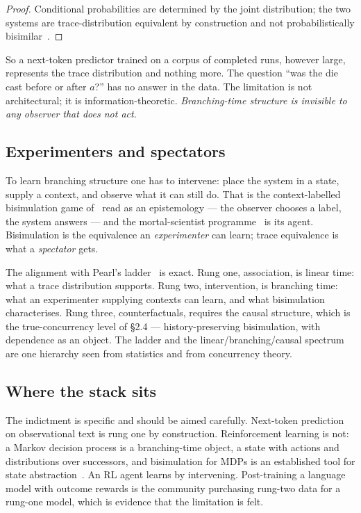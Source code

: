 \documentclass[11pt]{article}
\theoremstyle{plain}
\theoremstyle{definition}
\theoremstyle{remark}
\begin{document}
\begin{proof}
Conditional probabilities are determined by the joint distribution; the two systems are
trace-distribution equivalent by construction and not probabilistically
bisimilar~\cite{LarsenSkou91}.
\end{proof}

So a next-token predictor trained on a corpus of completed runs, however
large, represents the trace distribution and nothing more. The question
``was the die cast before or after $a$?'' has no answer in the data. The
limitation is not architectural; it is information-theoretic.
\emph{Branching-time structure is invisible to any observer that does not
act.}

\subsection{Experimenters and spectators}

To learn branching structure one has to intervene: place the system in a
state, supply a context, and observe what it can still do. That is the
context-labelled bisimulation game of~\cite{BIHOL,Extension} read as an
epistemology --- the observer chooses a label, the system answers --- and the
mortal-scientist programme~\cite{Scientist} is its agent. Bisimulation is the
equivalence an \emph{experimenter} can learn; trace equivalence is what a
\emph{spectator} gets.

The alignment with Pearl's ladder~\cite{Pearl09} is exact. Rung one,
association, is linear time: what a trace distribution supports. Rung two,
intervention, is branching time: what an experimenter supplying contexts can
learn, and what bisimulation characterises. Rung three, counterfactuals,
requires the causal structure, which is the true-concurrency level of
\S2.4 --- history-preserving bisimulation, with dependence as an object. The
ladder and the linear/branching/causal spectrum are one hierarchy seen from
statistics and from concurrency theory.

\subsection{Where the stack sits}

The indictment is specific and should be aimed carefully. Next-token
prediction on observational text is rung one by construction. Reinforcement
learning is not: a Markov decision process is a branching-time object, a
state with actions and distributions over successors, and bisimulation for
MDPs is an established tool for state abstraction~\cite{GivanDeanGreig03}. An
RL agent learns by intervening. Post-training a language model with outcome
rewards is the community purchasing rung-two data for a rung-one model, which
is evidence that the limitation is felt.
\end{document}
